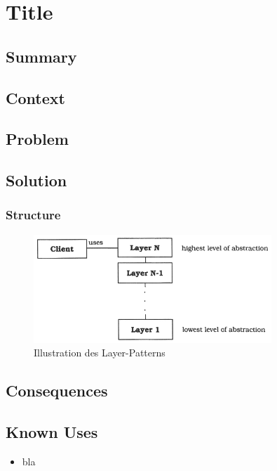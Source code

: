 \chapter{Title}

\section{Summary}

\section{Context}


\section{Problem}


\section{Solution}


\subsection{Structure}

\begin{figure}[H]
  \centering
  \includegraphics[width=0.8\textwidth]{figures/00-layers-1}
  \caption{Illustration des Layer-Patterns}
\end{figure}

\section{Consequences}
\begin{itemize}
\end{itemize}

\section{Known Uses}
\begin{itemize}
	\item bla 
\end{itemize}

